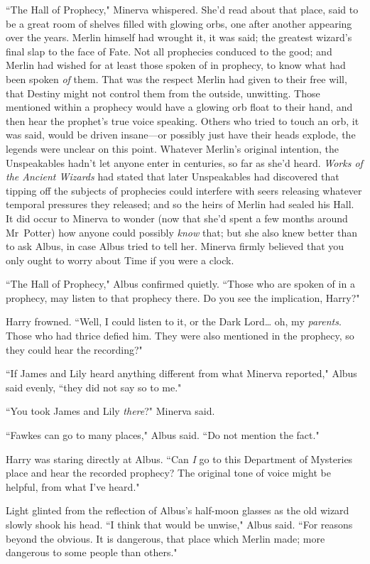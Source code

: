``The Hall of Prophecy," Minerva whispered. She'd read about that place, said to be a great room of shelves filled with glowing orbs, one after another appearing over the years. Merlin himself had wrought it, it was said; the greatest wizard's final slap to the face of Fate. Not all prophecies conduced to the good; and Merlin had wished for at least those spoken of in prophecy, to know what had been spoken \emph{of} them. That was the respect Merlin had given to their free will, that Destiny might not control them from the outside, unwitting. Those mentioned within a prophecy would have a glowing orb float to their hand, and then hear the prophet's true voice speaking. Others who tried to touch an orb, it was said, would be driven insane—or possibly just have their heads explode, the legends were unclear on this point. Whatever Merlin's original intention, the Unspeakables hadn't let anyone enter in centuries, so far as she'd heard. \emph{Works of the Ancient Wizards} had stated that later Unspeakables had discovered that tipping off the subjects of prophecies could interfere with seers releasing whatever temporal pressures they released; and so the heirs of Merlin had sealed his Hall. It did occur to Minerva to wonder (now that she'd spent a few months around Mr~Potter) how anyone could possibly \emph{know} that; but she also knew better than to ask Albus, in case Albus tried to tell her. Minerva firmly believed that you only ought to worry about Time if you were a clock.

``The Hall of Prophecy," Albus confirmed quietly. ``Those who are spoken of in a prophecy, may listen to that prophecy there. Do you see the implication, Harry?"

Harry frowned. ``Well, I could listen to it, or the Dark Lord{\ldots} oh, my \emph{parents}. Those who had thrice defied him. They were also mentioned in the prophecy, so they could hear the recording?"

``If James and Lily heard anything different from what Minerva reported," Albus said evenly, ``they did not say so to me."

``You took James and Lily \emph{there}?" Minerva said.

``Fawkes can go to many places," Albus said. ``Do not mention the fact."

Harry was staring directly at Albus. ``Can \emph{I} go to this Department of Mysteries place and hear the recorded prophecy? The original tone of voice might be helpful, from what I've heard."

Light glinted from the reflection of Albus's half-moon glasses as the old wizard slowly shook his head. ``I think that would be unwise," Albus said. ``For reasons beyond the obvious. It is dangerous, that place which Merlin made; more dangerous to some people than others."

